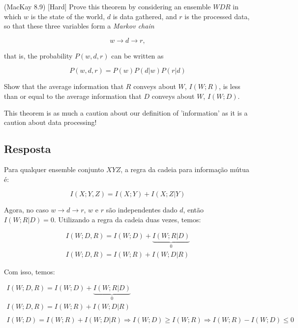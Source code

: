 (MacKay 8.9) [Hard]
Prove this theorem by considering an ensemble $WDR$ in which $w$ is the state of the world, $d$ is data gathered, and $r$ is the processed data, so that these three variables form a \textit{Markov chain}

\[w \rightarrow d \rightarrow r,\]

that is, the probability $P(w, d, r)$ can be written as

\[P(w, d, r) = P(w)P(d | w)P(r | d)\]

Show that the average information that $R$ conveys about $W$, $I(W;R)$, is less than or equal to the average information that $D$ conveys about $W$, $I(W;D)$.

This theorem is as much a caution about our definition of 'information' as it
is a caution about data processing!

\subsection*{Resposta}

Para qualquer ensemble conjunto $XYZ$, a regra da cadeia para informação mútua é:

\[I(X;Y,Z) = I(X;Y) + I(X;Z|Y)\]

Agora, no caso $w \rightarrow d \rightarrow r$, $w$ e $r$ são independentes dado $d$, então $I(W;R|D) = 0$. Utilizando a regra da cadeia duas vezes, temos:

\[\begin{array}{l}
I(W;D,R) = I(W;D) + \underbrace {I(W;R|D)}_0\\
I(W;D,R) = I(W;R) + I(W;D|R)
\end{array}\]

Com isso, temos:

\[\begin{array}{l}
I(W;D,R) = I(W;D) + \underbrace {I(W;R|D)}_0\\
I(W;D,R) = I(W;R) + I(W;D|R)\\
\\
I(W;D) = I(W;R) + I(W;D|R) \Rightarrow I(W;D) \ge I(W;R) \Rightarrow I(W;R) - I(W;D) \le 0
\end{array}\]